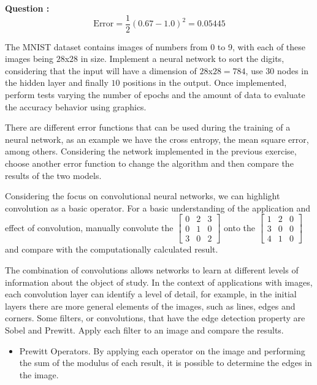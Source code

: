 \begin{list}{
\textbf{Question :}~}{}
$$
\text{Error}
=
\frac{1}{2}(0.67-1.0)^2=0.05445
$$


\item The MNIST dataset contains images of numbers from 0 to 9, with each of these images being $28$x$28$ in size. Implement a neural network to sort the digits, considering that the input will have a dimension of $28$x$28=784$, use $30$ nodes in the hidden layer and finally $10$ positions in the output. Once implemented, perform tests varying the number of epochs and the amount of data to evaluate the accuracy behavior using graphics.


\item There are different error functions that can be used during the training of a neural network, as an example we have the cross entropy, the mean square error, among others. Considering the network implemented in the previous exercise, choose another error function to change the algorithm and then compare the results of the two models.
\fi

\item \noindent Considering the focus on convolutional neural networks, we can highlight convolution as a basic operator. For a basic understanding of the application and effect of convolution, manually convolute the $\left[\begin{smallmatrix}
0 & 2 & 3\\
0 & 1 & 0\\
3 & 0 & 2
\end{smallmatrix}\right]$ onto the $\left[\begin{smallmatrix}
1 & 2 & 0\\
3 & 0 & 0\\
4 & 1 & 0
\end{smallmatrix}\right]$ and compare with the computationally calculated result. 


\item \noindent The combination of convolutions allows networks to learn at different levels of information about the object of study. In the context of applications with images, each convolution layer can identify a level of detail, for example, in the initial layers there are more general elements of the images, such as lines, edges and corners. Some filters, or convolutions, that have the edge detection property are Sobel and Prewitt. Apply each filter to an image and compare the results.


\begin{itemize}
\item Prewitt Operators. By applying each operator on the image and performing the sum of the modulus of each result, it is possible to determine the edges in the image.


\end{itemize}
\end{list}
